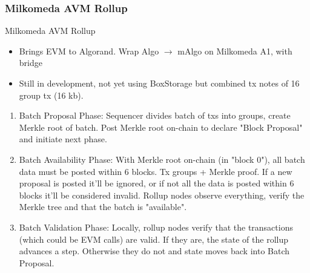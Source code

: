\documentclass[aspectratio=169,xcolor=dvipsnames]{beamer}
\begin{document}
\subsubsection{Milkomeda AVM Rollup}
\begin{frame}{Milkomeda AVM Rollup}
\begin{itemize}
    \item Brings EVM to Algorand. Wrap Algo $\rightarrow$ mAlgo on Milkomeda A1, with bridge
    \item Still in development, not yet using BoxStorage but combined tx notes of 16 group tx (16 kb).
\end{itemize}
\begin{enumerate}
    \item Batch Proposal Phase: Sequencer divides batch of txs into groups, create Merkle root of batch. Post Merkle root on-chain to declare "Block Proposal" and initiate next phase.
    \item Batch Availability Phase: With Merkle root on-chain (in "block 0"), all batch data must be posted within 6 blocks. Tx groups + Merkle proof. If a new proposal is posted it'll be ignored, or if not all the data is posted within 6 blocks it'll be considered invalid. Rollup nodes observe everything, verify the Merkle tree and that the batch is "available".
    \item Batch Validation Phase: Locally, rollup nodes verify that the transactions (which could be EVM calls) are valid. If they are, the state of the rollup advances a step. Otherwise they do not and state moves back into Batch Proposal.
\end{enumerate}
\end{frame}
\end{document}
